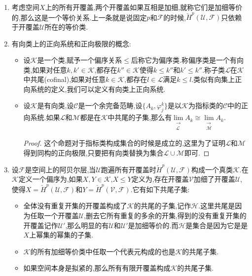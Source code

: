 \begin{enumerate}
\begin{proof}
		设$\mathscr{U}=\{U_i\mid i\in I\}$和$\mathscr{V}=\{V_j\mid j\in J\}$.取加细映射$\sigma:I\to J$和加细映射$\tau:J\to I$.那么$\tau\circ\sigma$是$I\to I$的加细映射.我们解释过诱导的同调同态不依赖具体加细映射的选取,所以这个复合映射诱导的同调映射理应与$I\to I$的恒等映射诱导的同调映射相同,于是有$\tau^*\circ\sigma^*=(\tau\circ\sigma)^*=\mathrm{id}$.同理有$\sigma^*\circ\tau^*=\mathrm{id}$.这说明诱导的同调映射都是同构.
	\end{proof}
	\item 考虑空间$X$上的所有开覆盖,两个开覆盖如果互相是加细,就称它们是加细等价的,那么这是一个等价关系.上一条就是说固定$p$和$\mathscr{F}$的时候,$\check{H}^p(\mathscr{U},\mathscr{F})$只依赖于开覆盖$\mathscr{U}$所在的等价类.
	\item 有向类上的正向系统和正向极限的概念:
	\begin{itemize}
		\item 设$\mathscr{K}$是一个类,赋予一个偏序关系$\le$后称它为偏序类.称偏序类是一个有向类,如果对任意$k,k'\in\mathscr{K}$,都存在$k''\in\mathscr{K}$使得$k\le k''$和$k'\le k''$.称子类$\mathscr{L}$在$\mathscr{K}$中共尾(cofinal),如果对任意$k\in\mathscr{K}$,都存在$l\in\mathscr{L}$满足$k\le l$.类似有向集上正向系统的定义,我们可以定义有向类上正向系统.
		\item 设$\mathscr{K}$是有向类,设$\mathscr{C}$是一个余完备范畴,设$\{A_k,\varphi_j^k\}$是以$\mathscr{K}$为指标类的$\mathscr{C}$中的正向系统.如果$\mathscr{L}$和$\mathscr{M}$都是在$\mathscr{K}$中共尾的子集,那么有$\lim\limits_{\substack{\rightarrow\\\mathscr{L}}}A_k\cong\lim\limits_{\substack{\rightarrow\\\mathscr{M}}}A_k$.
		\begin{proof}
			
			这个命题对于指标类构成集合的时候是成立的,这里为了证明$\mathscr{L}$和$\mathscr{M}$得到同构的正向极限,只要把有向类替换为集合$\mathscr{L}\cup\mathscr{M}$即可.
		\end{proof}
	\end{itemize}
	\item 设$\mathscr{F}$是空间上的阿贝尔层,当$\mathscr{U}$跑遍所有开覆盖时$\check{H}^p(\mathscr{U},\mathscr{F})$构成一个真类$\mathscr{K}$.在$\mathscr{K}$定义一个偏序为,如果$X,Y\in\mathscr{K}$,$X\le Y$定义为,存在开覆盖$\mathscr{V}$加细了开覆盖$\mathscr{U}$,使得$X=\check{H}^p(\mathscr{U},\mathscr{F})$和$Y=\check{H}^p(\mathscr{V},\mathscr{F})$.它有如下共尾子集:
	\begin{itemize}
		\item 全体没有重复开集的开覆盖构成了$\mathscr{K}$的共尾的子集,记作$\mathscr{H}$.这里共尾是因为任取一个开覆盖$\mathscr{U}$,删去它所有重复的多余的开集,得到的没有重复开集的开覆盖记作$\mathscr{U'}$,那么明显的有$\mathscr{U}$和$\mathscr{U}'$是加细等价的.而$\mathscr{H}$是集合是因为它是是$X$上幂集的幂集的子集.
		\item $\mathscr{K}$的所有加细等价类中任取一个代表元构成的也是$\mathscr{K}$的共尾子集.
		\item 如果空间本身是拟紧的,那么所有有限开覆盖构成$\mathscr{K}$的共尾子集.
	\end{itemize}
	

\end{enumerate}
